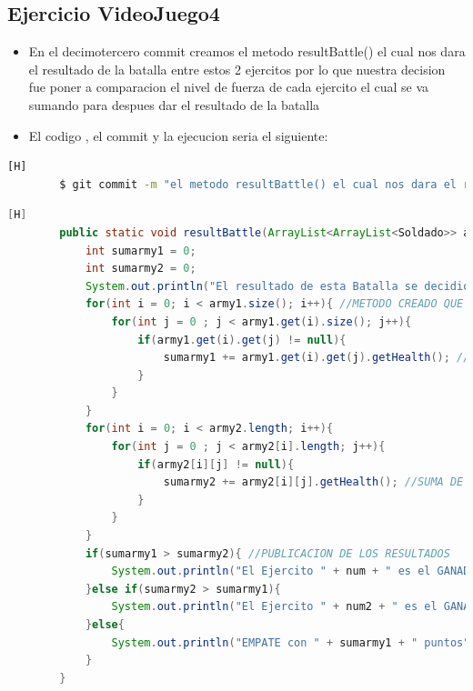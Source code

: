 \documentclass{article}
\begin{document}
	\subsection{Ejercicio VideoJuego4}
	\begin{itemize}	
		\item En el decimotercero commit creamos el metodo resultBattle() el cual nos dara el resultado de la batalla entre estos 2 ejercitos por lo que nuestra decision fue poner a comparacion el nivel de fuerza de cada ejercito el cual se va sumando para despues dar el resultado de la batalla
		\item El codigo , el commit y la ejecucion seria el siguiente:
	\end{itemize}	
	\begin{lstlisting}[language=bash,caption={Commit}][H]
		$ git commit -m "el metodo resultBattle() el cual nos dara el resultado de la batalla entre estos 2 ejercitos por lo que nuestra decision fue poner a comparacion el nivel de fuerza de cada ejercito el cual se va sumando para despues dar el resultado de la batalla"
	\end{lstlisting}	
	\begin{lstlisting}[language=java,caption={Las lineas de codigos del metodo creado:}][H]
		public static void resultBattle(ArrayList<ArrayList<Soldado>> army1, Soldado[][] army2, int num, int num2){
			int sumarmy1 = 0;
			int sumarmy2 = 0;
			System.out.println("El resultado de esta Batalla se decidio por el nivel de fuerza de cada ejercito por lo que el resultado es: ...");
			for(int i = 0; i < army1.size(); i++){ //METODO CREADO QUE NOS PERMITE DAR CON UN GANADOR ESTO GRACIAS AL NIVEL DE PUNTOS DE VIDA O FUERZA DE CADA EJERCITO EL CUAL VAMOS SUMANDO DE CADA EJERCITO PARA DESPUES COMPARARLOS Y DECIDIR EL RESULTADO DE ESTA BATALLA
				for(int j = 0 ; j < army1.get(i).size(); j++){
					if(army1.get(i).get(j) != null){
						sumarmy1 += army1.get(i).get(j).getHealth(); //SUMA DE PUNTOS DEL EJERCITO 1
					}
				}
			}
			for(int i = 0; i < army2.length; i++){
				for(int j = 0 ; j < army2[i].length; j++){
					if(army2[i][j] != null){
						sumarmy2 += army2[i][j].getHealth(); //SUMA DE PUNTOS DEL EJERCITO 2
					}
				}
			}
			if(sumarmy1 > sumarmy2){ //PUBLICACION DE LOS RESULTADOS
				System.out.println("El Ejercito " + num + " es el GANADOR con " + sumarmy1 + " puntos");
			}else if(sumarmy2 > sumarmy1){
				System.out.println("El Ejercito " + num2 + " es el GANADOR con " + sumarmy2 + " puntos");
			}else{
				System.out.println("EMPATE con " + sumarmy1 + " puntos");
			}
		}
	\end{lstlisting}
\end{document}
